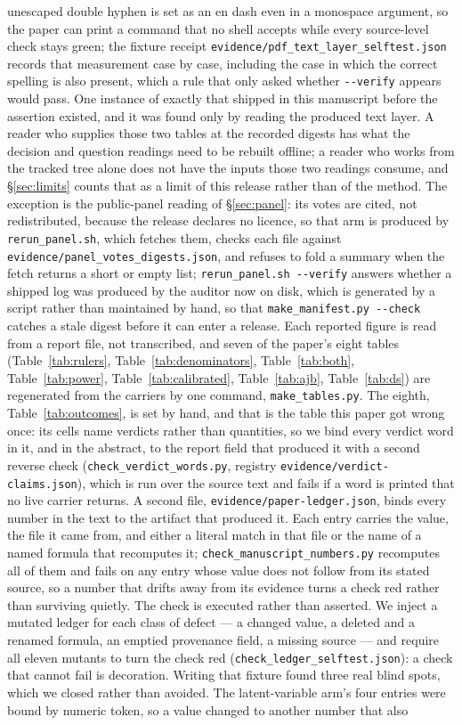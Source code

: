 \documentclass{article}
\newcommand{\ids}[1]{\texttt{\small #1}} %
\begin{document}
unescaped double hyphen is set as an en dash even in a monospace argument, so the paper can print a command that no shell accepts while every source-level check stays green; the fixture receipt \ids{evidence/pdf\_text\_layer\_selftest.json} records that measurement case by case, including the case in which the correct spelling is also present, which a rule that only asked whether \texttt{-{}-verify} appears would pass. One instance of exactly that shipped in this manuscript before the assertion existed, and it was found only by reading the produced text layer. A reader who supplies those two tables at the recorded digests has what the decision and question readings need to be rebuilt offline; a reader who works from the tracked tree alone does not have the inputs those two readings consume, and \S\ref{sec:limits} counts that as a limit of this release rather than of the method. The exception is the public-panel reading of \S\ref{sec:panel}: its votes are cited, not redistributed, because the release declares no licence, so that arm is produced by \ids{rerun\_panel.sh}, which fetches them, checks each file against \ids{evidence/panel\_votes\_digests.json}, and refuses to fold a summary when the fetch returns a short or empty list; \ids{rerun\_panel.sh -{}-verify} answers whether a shipped log was produced by the auditor now on disk, which is generated by a script rather than maintained by hand, so that \ids{make\_manifest.py -{}-check} catches a stale digest before it can enter a release. Each reported figure is read from a report file, not transcribed, and seven of the paper's eight tables (Table~\ref{tab:rulers}, Table~\ref{tab:denominators}, Table~\ref{tab:both}, Table~\ref{tab:power}, Table~\ref{tab:calibrated}, Table~\ref{tab:ajb}, Table~\ref{tab:ds}) are regenerated from the carriers by one command, \ids{make\_tables.py}. The eighth, Table~\ref{tab:outcomes}, is set by hand, and that is the table this paper got wrong once: its cells name verdicts rather than quantities, so we bind every verdict word in it, and in the abstract, to the report field that produced it with a second reverse check (\ids{check\_verdict\_words.py}, registry \ids{evidence/verdict-claims.json}), which is run over the source text and fails if a word is printed that no live carrier returns. A second file, \ids{evidence/paper-ledger.json}, binds every number in the text to the artifact that produced it. Each entry carries the value, the file it came from, and either a literal match in that file or the name of a named formula that recomputes it; \ids{check\_manuscript\_numbers.py} recomputes all of them and fails on any entry whose value does not follow from its stated source, so a number that drifts away from its evidence turns a check red rather than surviving quietly. The check is executed rather than asserted. We inject a mutated ledger for each class of defect --- a changed value, a deleted and a renamed formula, an emptied provenance field, a missing source --- and require all eleven mutants to turn the check red (\ids{check\_ledger\_selftest.json}): a check that cannot fail is decoration. Writing that fixture found three real blind spots, which we closed rather than avoided. The latent-variable arm's four entries were bound by numeric token, so a value changed to another number that also 
\end{document}
